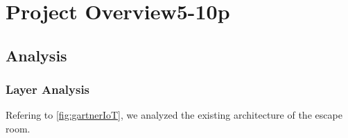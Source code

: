\chapter{Project Overview5-10p} %
\label{Chapter2} %
\section{Analysis}

\subsection{Layer Analysis}
Refering to \ref{fig:gartnerIoT}, we analyzed the existing architecture of the escape room.
